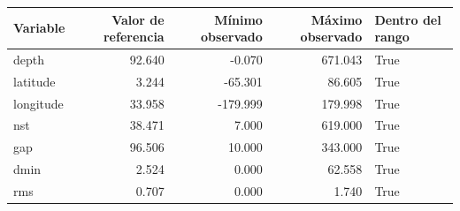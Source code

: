 \begin{tabular}{lrrrl}
\toprule
Variable & Valor de referencia & Mínimo observado & Máximo observado & Dentro del rango \\
\midrule
depth & 92.640 & -0.070 & 671.043 & True \\
latitude & 3.244 & -65.301 & 86.605 & True \\
longitude & 33.958 & -179.999 & 179.998 & True \\
nst & 38.471 & 7.000 & 619.000 & True \\
gap & 96.506 & 10.000 & 343.000 & True \\
dmin & 2.524 & 0.000 & 62.558 & True \\
rms & 0.707 & 0.000 & 1.740 & True \\
\bottomrule
\end{tabular}
